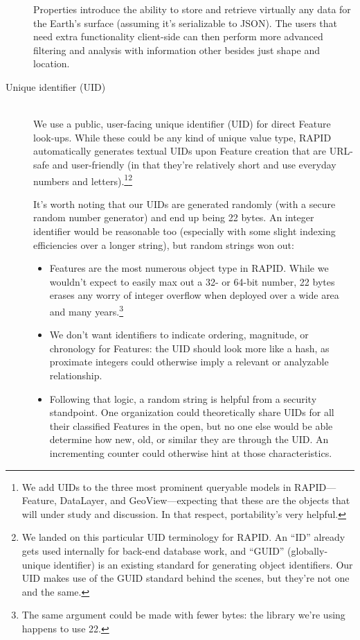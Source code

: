 \begin{description}
  Properties introduce the ability to store and retrieve virtually any data for the Earth's surface (assuming it's serializable to JSON). The users that need extra functionality client-side can then perform more advanced filtering and analysis with information other besides just shape and location.
  
  \item[Unique identifier (UID)] \hfill \\
  We use a public, user-facing unique identifier (UID) for direct Feature look-ups. While these could be any kind of unique value type, RAPID automatically generates textual UIDs upon Feature creation that are URL-safe and user-friendly (in that they're relatively short and use everyday numbers and letters).\footnote{We add UIDs to the three most prominent queryable models in RAPID---Feature, DataLayer, and GeoView---expecting that these are the objects that will under study and discussion. In that respect, portability's very helpful.}\footnote{We landed on this particular UID terminology for RAPID. An ``ID'' already gets used internally for back-end database work, and ``GUID'' (globally-unique identifier) is an existing standard for generating object identifiers. Our UID makes use of the GUID standard behind the scenes, but they're not one and the same.}
  
  It's worth noting that our UIDs are generated randomly (with a secure random number generator) and end up being 22 bytes. An integer identifier would be reasonable too (especially with some slight indexing efficiencies over a longer string), but random strings won out:
  
  \begin{itemize}
  \item Features are the most numerous object type in RAPID. While we wouldn't expect to easily max out a 32- or 64-bit number, 22 bytes erases any worry of integer overflow when deployed over a wide area and many years.\footnote{The same argument could be made with fewer bytes: the library we're using happens to use 22.}
  \item We don't want identifiers to indicate ordering, magnitude, or chronology for Features: the UID should look more like a hash, as proximate integers could otherwise imply a relevant or analyzable relationship.
  \item Following that logic, a random string is helpful from a security standpoint. One organization could theoretically share UIDs for all their classified Features in the open, but no one else would be able determine how new, old, or similar they are through the UID. An incrementing counter could otherwise hint at those characteristics.
\end{itemize}
  

\end{description}
